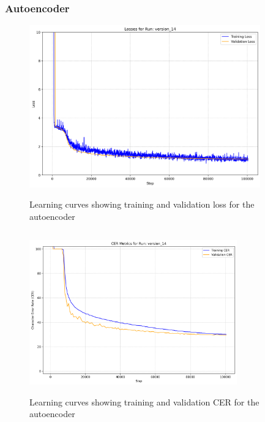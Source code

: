\subsubsection{Autoencoder}
\begin{figure}[h]
    \centering
    \begin{minipage}{0.48\textwidth}
        \centering
        \includegraphics[height=7cm,width=\textwidth]{../results/model-autoencoder-tiny/model-autoencoder-tiny_losses.png}
        \caption{Learning curves showing training and validation loss for the autoencoder}
        \label{fig:autoencoder_loss}
    \end{minipage}
    \hfill
    \begin{minipage}{0.48\textwidth}
        \centering
        \includegraphics[height=7cm, width=0.8\textwidth]{../results/model-autoencoder-tiny/model-autoencoder-tiny_cer.png}
        \caption{Learning curves showing training and validation CER for the autoencoder}
        \label{fig:autoencoder_cer}
    \end{minipage}
\end{figure}

